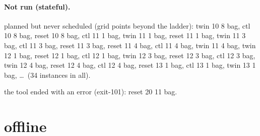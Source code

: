 \documentclass[10pt]{article}
\begin{document}
\paragraph{Not run (stateful).}
planned but never scheduled (grid points beyond the ladder): twin 10 8 bag, ctl 10 8 bag, reset 10 8 bag, ctl 11 1 bag, twin 11 1 bag, reset 11 1 bag, twin 11 3 bag, ctl 11 3 bag, reset 11 3 bag, reset 11 4 bag, ctl 11 4 bag, twin 11 4 bag, twin 12 1 bag, reset 12 1 bag, ctl 12 1 bag, twin 12 3 bag, reset 12 3 bag, ctl 12 3 bag, twin 12 4 bag, reset 12 4 bag, ctl 12 4 bag, reset 13 1 bag, ctl 13 1 bag, twin 13 1 bag, \ldots\ (34 instances in all).\par
the tool ended with an error (exit-101): reset 20 11 bag.\par
\section*{offline}
\end{document}
